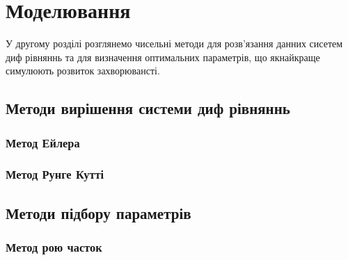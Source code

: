 
\chapter{Моделювання}


У другому розділі розглянемо чисельні методи для розв'язання 
данних сисетем диф рівняннь та для визначення оптимальних параметрів, що 
якнайкраще симулюють розвиток захворювансті.

\section{Методи вирішення системи диф рівняннь}

\subsection{Метод Ейлера}

\subsection{Метод Рунге Кутті}

\section{Методи підбору параметрів}


\subsection{Метод рою часток}

